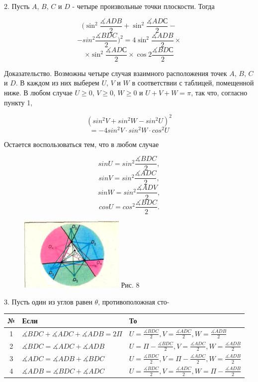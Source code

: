 \documentclass[twocolumn]{article}
\begin{document}
2. Пусть $A$, $B$, $C$ и $D$ - четыре произвольные точки плоскости. Тогда


$$(\sin^{2}\frac{\measuredangle ADB}{2}+\sin^{2}\frac{\measuredangle ADС}{2}-$$
$$-sin^{2}\frac{\measuredangle BDC}{2})^{2}=4\sin^{2}\frac{\measuredangle ADB}{2}\times$$
$$\times\sin^{2}\frac{\measuredangle ADС}{2}\times\cos{2}\frac{\measuredangle BDС}{2}$$



Доказательство. Возможны четыре случая взаимного расположения точек $A$, $B$, $C$ и $D$. В каждом из них выберем $U$, $V$ и $W$ в соответствии с таблицей, помещенной ниже. В любом случае $U \ge  0$, $V \ge  0$, $W \ge 0$ и $U + V + W = \pi$, так что, согласно пункту 1, 

$$(sin^{2}V + sin^{2}W - sin^{2}U)^2$$
$$= -4 sin^2 V \cdot  sin^2 W \cdot  cos^2 U$$

Остается воспользоваться тем, что в любом случае

$$sin U = sin^2 \frac{\measuredangle BDC}{2},$$
$$sin V = sin^2 \frac{\measuredangle ADC}{2},$$
$$sin W = sin^2 \frac{\measuredangle ADV}{2},$$
$$cos U = cos^2 \frac{\measuredangle BDC}{2}.$$

\begin{figure}
\includegraphics[width=0.45\textwidth]{рис8.png}
Рис. 8
\end{figure}

3. Пусть один из углов равен $\theta$, противоположная сто-

\begin{table}[b]
\centering
\renewcommand{\arraystretch}{1.7}
\begin{tabular}
{|c|p{7.5cm}|p{7.5cm}|}
\hline
\centering№ & Если & То \\
\hline
1 & $\measuredangle BDC +\measuredangle ADC + \measuredangle ADB =2\Pi$ & $U = \frac{\measuredangle BDC}{2},  V =\frac{\measuredangle ADC}{2}, W =\frac{\measuredangle ADB}{2}$ \\
\hline
2 & $\measuredangle BDC = \measuredangle ADC + \measuredangle ADB $ & $U = \Pi - \frac{\measuredangle BDC}{2},  V =\frac{\measuredangle ADC}{2}, W =\frac{\measuredangle ADB}{2}$ \\
\hline
3 & $\measuredangle ADC = \measuredangle ADB + \measuredangle BDC$ & $U =\frac{\measuredangle BDC}{2},  V = \Pi - \frac{\measuredangle ADC}{2}, W =\frac{\measuredangle ADB}{2}$ \\
\hline
4 & $\measuredangle ADB = \measuredangle BDC + \measuredangle ADC$ & $U =\frac{\measuredangle BDC}{2},  V =\frac{\measuredangle ADC}{2}, W =\Pi - \frac{\measuredangle ADB}{2}$ \\
\hline

\end{tabular}
\end{table}
\end{document}
